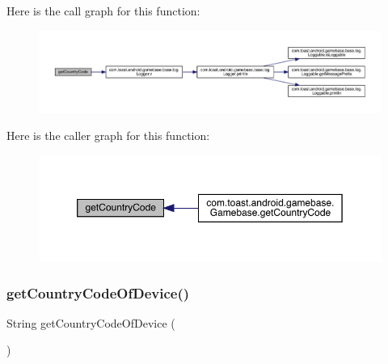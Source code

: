 Here is the call graph for this function\+:
\nopagebreak
\begin{figure}[H]
\begin{center}
\leavevmode
\includegraphics[width=350pt]{classcom_1_1toast_1_1android_1_1gamebase_1_1_gamebase_system_info_a561de249511c5e6d25b6b563eb95b80a_cgraph}
\end{center}
\end{figure}
Here is the caller graph for this function\+:
\nopagebreak
\begin{figure}[H]
\begin{center}
\leavevmode
\includegraphics[width=350pt]{classcom_1_1toast_1_1android_1_1gamebase_1_1_gamebase_system_info_a561de249511c5e6d25b6b563eb95b80a_icgraph}
\end{center}
\end{figure}
\mbox{\label{classcom_1_1toast_1_1android_1_1gamebase_1_1_gamebase_system_info_ae7f1fdcb983f98bd6220772e99634882}} 
\subsubsection{\texorpdfstring{get\+Country\+Code\+Of\+Device()}{getCountryCodeOfDevice()}}
{\footnotesize\ttfamily String get\+Country\+Code\+Of\+Device (\begin{DoxyParamCaption}{ }\end{DoxyParamCaption})}

